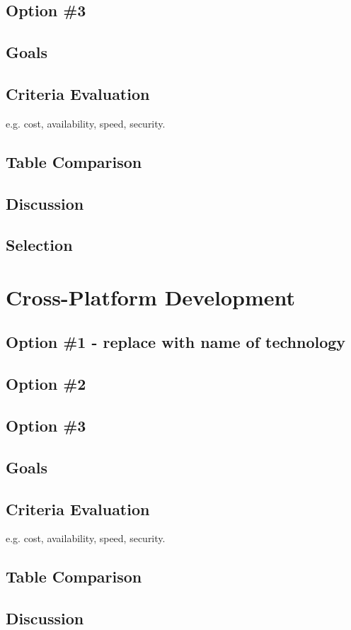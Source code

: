 \documentclass[letterpaper,10pt,draftclsnofoot,onecolumn,titlepage]{IEEEtran}
\begin{document}
	\subsection{Option \#3}
	\subsection{Goals}
	\subsection{Criteria Evaluation}
	e.g. cost, availability, speed, security.
	\subsection{Table Comparison}
	\subsection{Discussion}
	\subsection{Selection}
	
	\section{Cross-Platform Development}
	\subsection{Option \#1 - replace with name of technology}
	\subsection{Option \#2}
	\subsection{Option \#3}
	\subsection{Goals}
	\subsection{Criteria Evaluation}
	e.g. cost, availability, speed, security.
	\subsection{Table Comparison}
	\subsection{Discussion}
\end{document}
